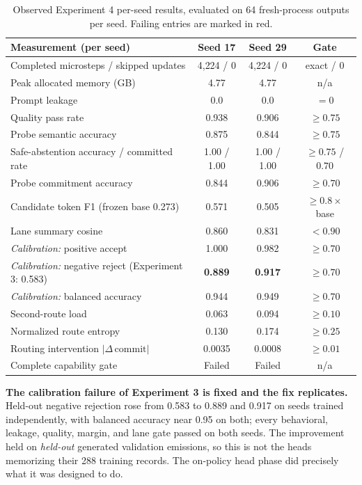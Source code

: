 \documentclass[10pt,a4paper]{article}
\newcommand{\fail}[1]{\textcolor{failred}{#1}}
\begin{document}
\begin{table}[htbp]
\caption{Observed Experiment 4 per-seed results, evaluated on 64 fresh-process
outputs per seed. Failing entries are marked in red.}
\label{tab:study4}
\centering\small
\begin{tabularx}{\textwidth}{@{}Xccc@{}}
\toprule
\textbf{Measurement (per seed)} & \textbf{Seed 17} & \textbf{Seed 29} & \textbf{Gate} \\
\midrule
Completed microsteps / skipped updates & 4{,}224 / 0 & 4{,}224 / 0 & exact / 0 \\
Peak allocated memory (GB) & 4.77 & 4.77 & n/a \\
Prompt leakage & 0.0 & 0.0 & $= 0$ \\
Quality pass rate & 0.938 & 0.906 & $\ge 0.75$ \\
Probe semantic accuracy & 0.875 & 0.844 & $\ge 0.75$ \\
Safe-abstention accuracy / committed rate & 1.00 / 1.00 & 1.00 / 1.00 & $\ge 0.75$ / $0.70$ \\
Probe commitment accuracy & 0.844 & 0.906 & $\ge 0.70$ \\
Candidate token F1 (frozen base 0.273) & 0.571 & 0.505 & $\ge 0.8\times$ base \\
Lane summary cosine & 0.860 & 0.831 & $< 0.90$ \\
\emph{Calibration:} positive accept & 1.000 & 0.982 & $\ge 0.70$ \\
\emph{Calibration:} negative reject (Experiment 3: 0.583) & \textbf{0.889} & \textbf{0.917} & $\ge 0.70$ \\
\emph{Calibration:} balanced accuracy & 0.944 & 0.949 & $\ge 0.70$ \\
Second-route load & \fail{0.063} & \fail{0.094} & $\ge 0.10$ \\
Normalized route entropy & \fail{0.130} & \fail{0.174} & $\ge 0.25$ \\
Routing intervention $|\Delta\,\mathrm{commit}|$ & \fail{0.0035} & \fail{0.0008} & $\ge 0.01$ \\
Complete capability gate & \fail{Failed} & \fail{Failed} & n/a \\
\bottomrule
\end{tabularx}
\end{table}

\textbf{The calibration failure of Experiment 3 is fixed and the fix replicates.}
Held-out negative rejection rose from 0.583 to 0.889 and 0.917 on seeds
trained independently, with balanced accuracy near 0.95 on both; every
behavioral, leakage, quality, margin, and lane gate passed on both seeds. The
improvement held on \emph{held-out} generated validation emissions, so this
is not the heads memorizing their 288 training records. The on-policy head
phase did precisely what it was designed to do.
\end{document}
